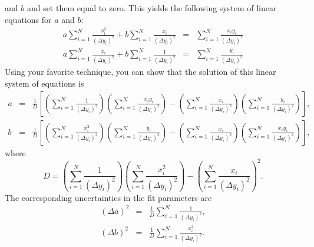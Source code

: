 and $b$ and set them equal to zero. This yields the following system of linear 
equations for $a$ and $b$:
\begin{eqnarray*}
a \sum^{N}_{i=1} \frac{x_i^2}{(\Delta y_i)^2} + b \sum^{N}_{i=1} \frac{x_i}
{(\Delta y_i)^2}
& = & \sum^{N}_{i=1} \frac{x_i y_i}{(\Delta y_i)^2} \\
a \sum^{N}_{i=1} \frac{x_i}{(\Delta y_i)^2} + b \sum^{N}_{i=1} \frac{1}
{(\Delta y_i)^2} & = & \sum^{N}_{i=1} \frac{y_i}{(\Delta y_i)^2} 
\end{eqnarray*}
Using your favorite technique, you can show that the solution of this linear 
system of equations is
\begin{eqnarray}
a &=&  \frac{1}{D} \left[ 
       \left( \sum^{N}_{i=1} \frac{1}{(\Delta y_i)^2}\right) 
       \left( \sum^{N}_{i=1} \frac{x_i y_i}{(\Delta y_i)^2} \right) -
       \left( \sum^{N}_{i=1} \frac{x_i}{(\Delta y_i)^2} \right)               
       \left( \sum^{N}_{i=1} \frac{y_i}{(\Delta y_i)^2} \right) \right],
\nonumber \\
b &=&  \frac{1}{D}  \left[ 
       \left( \sum^{N}_{i=1} \frac{x_i^2}{(\Delta y_i)^2} \right)
       \left( \sum^{N}_{i=1} \frac{y_i}{(\Delta y_i)^2} \right) -
       \left( \sum^{N}_{i=1} \frac{x_i}{(\Delta y_i)^2} \right)
       \left( \sum^{N}_{i=1} \frac{x_i y_i}{(\Delta y_i)^2} \right) \right],
\end{eqnarray}
where
\begin{equation}
D = \left( \sum^{N}_{i=1} \frac{1}{(\Delta y_i)^2} \right)
         \left( \sum^{N}_{i=1} \frac{x_i^2}{(\Delta y_i)^2} \right) -
         \left( \sum^{N}_{i=1} \frac{x_i}{(\Delta y_i)^2} \right)^2.
\end{equation}
The corresponding uncertainties in the fit parameters are
\begin{eqnarray}
(\Delta a)^2 &=& \frac{1}{D} \sum^{N}_{i=1} \frac{1}{(\Delta y_i)^2},
\nonumber \\
(\Delta b)^2 &=& \frac{1}{D} \sum^{N}_{i=1} \frac{x_i^2}{(\Delta y_i)^2}.
\end{eqnarray}

